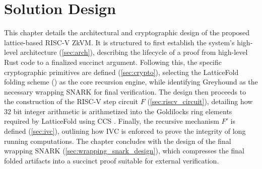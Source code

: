 \chapter{Solution Design}\label{chap:design}

This chapter details the architectural and cryptographic design of the
proposed lattice-based RISC-V ZkVM. It is structured to first
establish the system's high-level architecture (\ref{sec:arch}), describing the
lifecycle of a proof from high-level Rust code to a finalized succinct
argument. Following this, the specific cryptographic primitives are defined
(\ref{sec:crypto}), selecting the LatticeFold folding scheme (\cite{LatticeFold})
as the core recursion engine, while identifying Greyhound \cite{Greyhound} as
the necessary wrapping SNARK for final verification. The design then proceeds
to the construction of the RISC-V step circuit $F$ (\ref{sec:riscv_circuit}),
detailing how 32 bit integer arithmetic is arithmetized into the Goldilocks ring
elements required by LatticeFold using CCS \cite{CCS}. Finally, the recursive
mechanism $F'$ is defined (\ref{sec:ivc}), outlining
how IVC \cite{ValiantIVC} is enforced to prove the integrity of long running
computations. The chapter concludes with the design of the final wrapping
SNARK (\ref{sec:wrapping_snark_design}), which compresses the final folded
artifacts into a succinct proof suitable for external verification.










